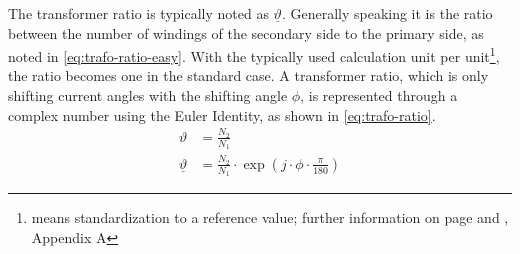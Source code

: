 The transformer ratio is typically noted as $\underline{\vartheta}$. 
Generally speaking it is the ratio between the number of windings of the secondary side to the primary side, as noted in \autoref{eq:trafo-ratio-easy}. 
With the typically used calculation unit \glqq per unit\grqq\footnote{means standardization to a reference value; further information on page \pageref{chap:symbols} and \textcite{machowski_2020}, Appendix A}, the ratio becomes one in the standard case. 
A transformer ratio, which is only shifting current angles with the shifting angle $\phi$, is represented through a complex number using the Euler Identity, as shown in \autoref{eq:trafo-ratio}.
\begin{align}
    \vartheta&=\frac{N_2}{N_1} \label{eq:trafo-ratio-easy} \\[6pt]
    \underline{\vartheta}&=\frac{N_2}{N_1} \cdot \exp(j \cdot \phi \cdot \frac{\pi}{180})\label{eq:trafo-ratio}
\end{align}

